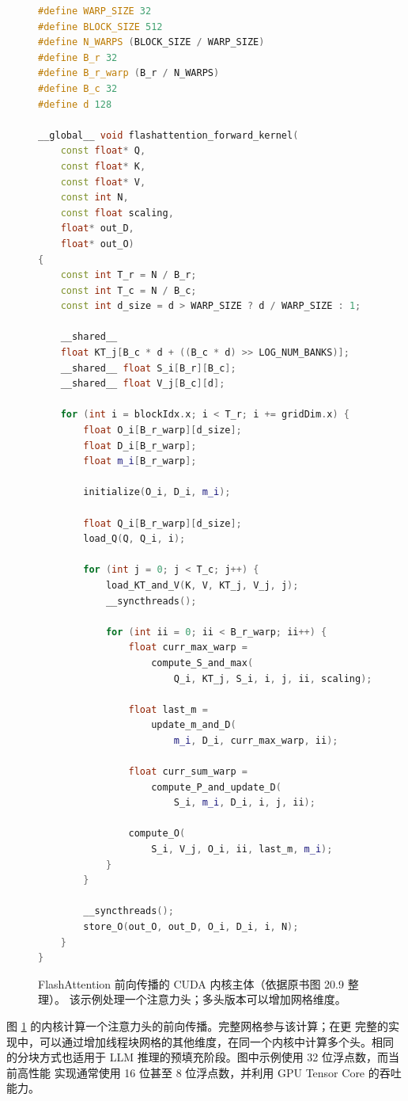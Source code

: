 \begin{figure}[htbp]
  \centering
  \begin{lstlisting}[language=C++,basicstyle=\ttfamily\tiny]
#define WARP_SIZE 32
#define BLOCK_SIZE 512
#define N_WARPS (BLOCK_SIZE / WARP_SIZE)
#define B_r 32
#define B_r_warp (B_r / N_WARPS)
#define B_c 32
#define d 128

__global__ void flashattention_forward_kernel(
    const float* Q,
    const float* K,
    const float* V,
    const int N,
    const float scaling,
    float* out_D,
    float* out_O)
{
    const int T_r = N / B_r;
    const int T_c = N / B_c;
    const int d_size = d > WARP_SIZE ? d / WARP_SIZE : 1;

    __shared__
    float KT_j[B_c * d + ((B_c * d) >> LOG_NUM_BANKS)];
    __shared__ float S_i[B_r][B_c];
    __shared__ float V_j[B_c][d];

    for (int i = blockIdx.x; i < T_r; i += gridDim.x) {
        float O_i[B_r_warp][d_size];
        float D_i[B_r_warp];
        float m_i[B_r_warp];

        initialize(O_i, D_i, m_i);

        float Q_i[B_r_warp][d_size];
        load_Q(Q, Q_i, i);

        for (int j = 0; j < T_c; j++) {
            load_KT_and_V(K, V, KT_j, V_j, j);
            __syncthreads();

            for (int ii = 0; ii < B_r_warp; ii++) {
                float curr_max_warp =
                    compute_S_and_max(
                        Q_i, KT_j, S_i, i, j, ii, scaling);

                float last_m =
                    update_m_and_D(
                        m_i, D_i, curr_max_warp, ii);

                float curr_sum_warp =
                    compute_P_and_update_D(
                        S_i, m_i, D_i, i, j, ii);

                compute_O(
                    S_i, V_j, O_i, ii, last_m, m_i);
            }
        }

        __syncthreads();
        store_O(out_O, out_D, O_i, D_i, i, N);
    }
}
  \end{lstlisting}
  \caption{FlashAttention 前向传播的 CUDA 内核主体（依据原书图 20.9 整理）。
  该示例处理一个注意力头；多头版本可以增加网格维度。}
  \label{fig:20-9}
\end{figure}

图 \ref{fig:20-9} 的内核计算一个注意力头的前向传播。完整网格参与该计算；在更
完整的实现中，可以通过增加线程块网格的其他维度，在同一个内核中计算多个头。相同
的分块方式也适用于 LLM 推理的预填充阶段。图中示例使用 32 位浮点数，而当前高性能
实现通常使用 16 位甚至 8 位浮点数，并利用 GPU Tensor Core 的吞吐能力。

